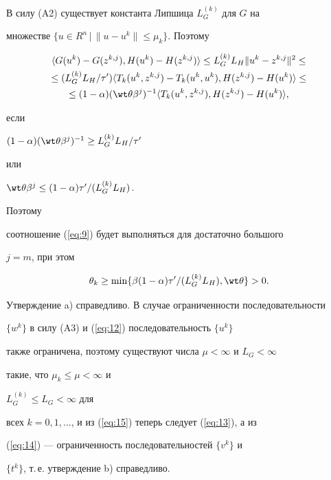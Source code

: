 \begin{pf}
\begin{equation}
\end{equation}


В силу (A2) существует константа Липшица $L_{G}^{(k)}$ для $G$ на 


множестве $\{ u \in R^{n} \, \big|\, \|u-u^{k}\|\leq\mu_{k} \}$. Поэтому


\begin{multline*}


\langle G(u^{k}) - G(z^{k,j}), H(u^{k}) - H(z^{k,j}) \rangle 


\leq L_{G}^{(k)} L_{H} \| u^{k} - z^{k,j} \|^{2} \le \\


%


\leq(L_{G}^{(k)} L_{H} / \tau') 


\langle T_{k}(u^{k}, z^{k,j}) - T_{k}(u^{k}, u^{k}),


H(z^{k,j}) - H(u^{k}) \rangle \le \\


%


\leq(1 - \alpha)(\wt \theta \beta ^{j})^{-1}


\langle T_{k}(u^{k}, z^{k,j}), 


H(z^{k,j}) - H(u^{k}) \rangle ,


\end{multline*}


если


$(1 - \alpha)(\wt \theta \beta ^{j})^{-1} \geq L_{G}^{(k)} L_{H} / \tau'$ 


или


$\wt \theta \beta^{j} \leq(1 - \alpha) \tau' /(L_{G}^{(k)} L_{H})$.


Поэтому 


соотношение (\ref{eq:9}) будет выполняться для достаточно большого 


$j=m$, при этом 


\begin{equation} \label{eq:15} 


\theta_{k} \geq \min \{ \beta(1 - \alpha) \tau' /(L_{G}^{(k)} L_{H}), \wt \theta \} > 0. 


\end{equation}


Утверждение a) справедливо. В случае ограниченности последовательности 


$\{ w^{k} \}$ в силу (A3) и (\ref{eq:12}) последовательность $\{ u^{k} \}$


также ограничена, поэтому существуют числа $\mu < \infty $ и $L_{G} < \infty$ 


такие, что $\mu_{k} \leq \mu < \infty $ и


$L_{G}^{(k)} \leq L_{G} < \infty $ для 


всех $k=0,1,\dotsc$, и из (\ref{eq:15}) теперь следует (\ref{eq:13}), а из


(\ref{eq:14}) --- ограниченность последовательностей $\{ v^{k} \}$ и


$\{ t^{k} \}$, т.\,е. утверждение b) справедливо.


\end{pf}





